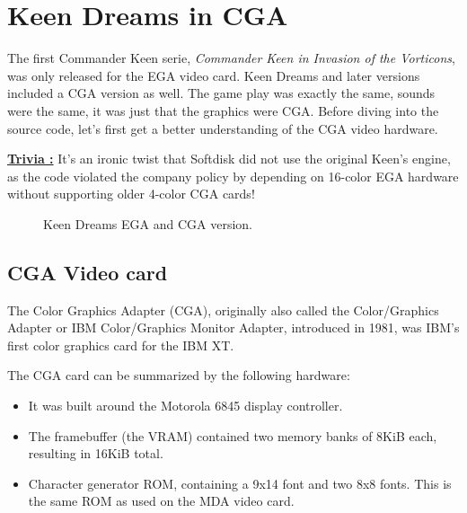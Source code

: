 \documentclass[book.tex]{subfiles}
\begin{document}
\pagebreak
\section{Keen Dreams in CGA}
The first Commander Keen serie, \textit{Commander Keen in Invasion of the Vorticons}, was only released for the EGA video card. Keen Dreams and later versions included a CGA version as well. The game play was exactly the same, sounds were the same, it was just that the graphics were CGA. Before diving into  the source code, let's first get a better understanding of the CGA video hardware.\\

\par
\textbf{\underline{Trivia :}} It's an ironic twist that Softdisk did not use the original Keen's engine, as the code violated the company policy by depending on 16-color EGA hardware without supporting older 4-color CGA cards!\\
\par

\begin{figure}[H] 
  \centering 
  \caption{Keen Dreams EGA and CGA version.}
\end{figure}




 

\subsection{CGA Video card}
The Color Graphics Adapter (CGA), originally also called the Color/Graphics Adapter or IBM Color/Graphics Monitor Adapter, introduced in 1981, was IBM's first color graphics card for the IBM XT.\\
\par
The CGA card can be summarized by the following hardware:
\begin{itemize}
  \item It was built around the Motorola 6845 display controller.
  \item The framebuffer (the VRAM) contained two memory banks of 8KiB each, resulting in 16KiB total.
  \item Character generator ROM, containing a 9x14 font and two 8x8 fonts. This is the same ROM as used on the MDA video card.
\end{itemize}
\end{document}
